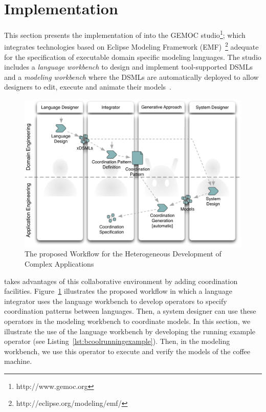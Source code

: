 \section{Implementation}
\label{section:bcoollengbench}
This section presents the implementation of \bcool into the GEMOC studio\footnote{http://www.gemoc.org}; which integrates technologies based on Eclipse Modeling Framework (EMF)~\footnote{http://eclipse.org/modeling/emf/} adequate for the specification of executable domain specific modeling languages. The studio includes a \emph{language workbench} to design and implement tool-supported DSMLs and a \emph{modeling workbench} where the DSMLs are automatically deployed to allow designers to edit, execute and animate their models~\cite{ttc15bib}.

\begin{figure}
	\begin{center}
		\includegraphics[width=.6\textwidth]{bcool/figs/process}
		\caption{The proposed Workflow for the Heterogeneous Development of Complex Applications}
		\label{fig:proposedworkflow}
	\end{center}
\end{figure}

\bcool takes advantages of this collaborative environment by adding coordination facilities. Figure~\ref{fig:proposedworkflow} illustrates the proposed workflow in which a language integrator uses the language workbench to develop \bcool operators to specify coordination patterns between languages. Then, a system designer can use these operators in the modeling workbench to coordinate models. In this section, we illustrate the use of the language workbench by developing the running example operator (see Listing~\ref{lst:bcoolrunningexample}). Then, in the modeling workbench, we use this operator to execute and verify the models of the coffee machine. 


